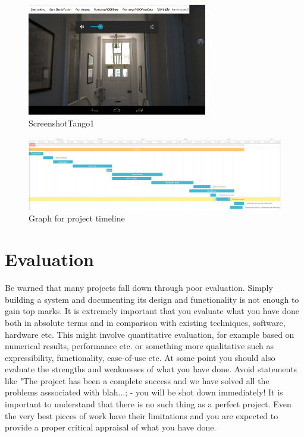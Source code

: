 \documentclass[12pt,twoside]{article}
\begin{document}
\begin{figure}[h]
    \centering
    \includegraphics[width=0.7\textwidth]{figures/ScreenshotTango1}
    \caption{ScreenshotTango1}
    \label{fig:ScreenshotTango1}
\end{figure}


\newpage

\begin{figure}
\centering
    \includegraphics[angle=90,width=\textwidth,height=\textheight,keepaspectratio]{figures/timeline2}
   \caption{Graph for project timeline}
    \label{fig:tiemline2}
\end{figure}

\newpage

\section{Evaluation}


Be warned that many projects fall down through poor evaluation. Simply building a system and documenting its design and functionality is not enough to gain top marks. It is extremely important that you evaluate what you have done both in absolute terms and in comparison with existing techniques, software, hardware etc. This might involve quantitative evaluation, for example based on numerical results, performance etc. or something more qualitative such as expressibility, functionality, ease-of-use etc. At some point you should also evaluate the strengths and weaknesses of what you have done. Avoid statements like "The project has been a complete success and we have solved all the problems asssociated with blah...; - you will be shot down immediately! It is important to understand that there is no such thing as a perfect project. Even the very best pieces of work have their limitations and you are expected to provide a proper critical appraisal of what you have done.\\
\end{document}
